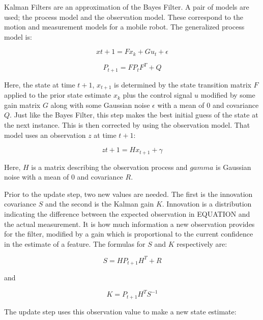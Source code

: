 \documentclass[12pt]{report}
\begin{document}
Kalman Filters are an approximation of the Bayes Filter.  A pair of models are used; the process model and the observation model.  These correspond to the motion and measurement models for a mobile robot.  The generalized process model is: 

\begin{equation}\label{kf_process_mean}
x{t+1} = Fx_k + Gu_t + \epsilon
\end{equation}

\begin{equation}\label{kf_process_cov}
P_{t+1} = FP_tF^T + Q
\end{equation}

Here, the state at time $t+1$, $x_{t+1}$ is determined by the state transition matrix $F$ applied to the prior state estimate $x_k$ plus the control signal $u$ modified by some gain matrix $G$ along with some Gaussian noise $\epsilon$ with a mean of 0 and covariance $Q$.	Just like the Bayes Filter, this step makes the best initial guess of the state at the next instance.  This is then corrected by using the observation model.  That model uses an observation $z$ at time $t+1$:

\begin{equation}\label{kf_observation}
z{t+1} = Hx_{t+1} + \gamma
\end{equation}

Here, $H$ is a matrix describing the observation process and $gamma$ is Gaussian noise with a mean of 0 and covariance $R$.  

Prior to the update step, two new values are needed.  The first is the innovation covariance $S$ and the second is the Kalman gain $K$.  Innovation is a distribution indicating the difference between the expected observation in {EQUATION} and the actual measurement.  It is how much information a new observation provides for the filter, modified by a gain which is proportional to the current confidence in the estimate of a feature.  The formulas for $S$ and $K$ respectively are:

\begin{equation}\label{kf_innovation}
S = HP_{t+1}H^T + R
\end{equation}

and

\begin{equation}\label{kf_gain}
K = P_{t+1}H^TS^{-1}
\end{equation}

The update step uses this observation value to make a new state estimate:
\end{document}
